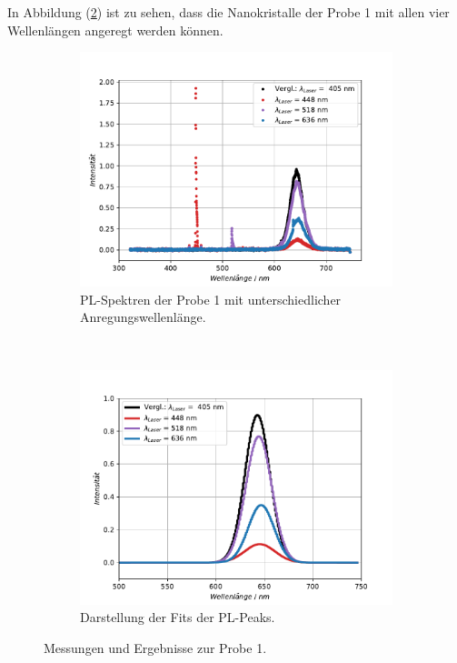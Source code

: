 In Abbildung (\ref{abb:auf2p1b}) ist zu sehen, dass die Nanokristalle der Probe 1 mit allen vier Wellenl\"{a}ngen angeregt werden k\"{o}nnen.
\begin{figure}[hbtp]
\centering
	\begin{subfigure}[t]{0.45\textwidth}
	\includegraphics[width=\textwidth]{Plots/aufgabe2P1.pdf}
	\caption{PL-Spektren der Probe 1 mit unterschiedlicher Anregungswellenl\"{a}nge.}
	\label{abb:auf2p1a}
	\end{subfigure}
	~
	\begin{subfigure}[t]{0.45\textwidth}
	\includegraphics[width=\textwidth]{Plots/aufgabe2P1_fit_1s.pdf}
	\caption{Darstellung der Fits der PL-Peaks.}
	\label{abb:auf2p1b}
	\end{subfigure}
\caption{Messungen und Ergebnisse zur Probe 1.}
\label{abb:auf2P1}
\end{figure}
